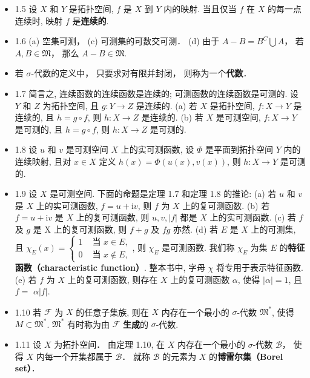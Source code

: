 \begin{itemize}
\item 1.5 设 $X$ 和 $Y$ 是拓扑空间, $f$ 是 $X$ 到 $Y$ 内的映射. 当且仅当 $f$ 在 $X$ 的每一点连续时, 映射 $f$ 是\textbf{连续的}.

\item 1.6 (a) 空集可测， (c) 可测集的可数交可测． (d) 由于 $A-B = B^C\bigcup A$， 若 $A,B \in \mathfrak{M}$， 那么 $A-B\in \mathfrak{M}$.

\item 若 $\sigma$-代数的定义中， 只要求对有限并封闭， 则称为一个\textbf{代数}．

\item 1.7 简言之, 连续函数的连续函数是连续的; 可测函数的连续函数是可测的. 设 $Y$ 和 $Z$ 为拓扑空间, 且 $g: Y \rightarrow Z$ 是连续的. (a) 若 $X$ 是拓扑空间, $f: X \rightarrow Y$ 是连续的, 且 $h=g \circ f$, 则 $h: X \rightarrow Z$ 是连续的. (b) 若 $X$ 是可测空间, $f: X \rightarrow Y$ 是可测的, 且 $h=g \circ f$, 则 $h: X \rightarrow Z$ 是可测的. 

\item 1.8 设 $u$ 和 $v$ 是可测空间 $X$ 上的实可测函数, 设 $\Phi$ 是平面到拓扑空间 $Y$ 内的连续映射, 且对 $x \in X$ 定义 $h(x)=\Phi(u(x), v(x))$, 则 $h: X \rightarrow Y$ 是可测的.

\item 1.9 设 $X$ 是可测空间. 下面的命题是定理 1.7 和定理 1.8 的推论:
(a) 若 $u$ 和 $v$ 是 $X$ 上的实可测函数, $f=u+\mathrm{i} v$, 则 $f$ 为 $X$ 上的复可测函数. 
(b) 若 $f=u+\mathrm{i} v$ 是 $X$ 上的复可测函数, 则 $u, v,|f|$ 都是 $X$ 上的实可测函数. 
(c) 若 $f$ 及 $g$ 是 $\mathrm{X}$ 上的复可测函数, 则 $f+g$ 及 $f g$ 亦然.
(d) 若 $E$ 是 $X$ 上的可测集, 且 $\chi_{E}(x)= \begin{cases}1 & \text { 当 } x \in E, \\ 0 & \text { 当 } x \notin E,\end{cases}$, 则 $\chi_{E}$ 是可测函数. 我们称 $\chi_{E}$ 为集 $E$ 的\textbf{特征函数（characteristic function）}. 整本书中, 字母 $\chi$ 将专用于表示特征函数.
(e) 若 $f$ 为 $X$ 上的复可测函数, 则存在 $X$ 上的复可测函数 $\alpha$, 使得 $|\alpha|=1$, 且 $f=$ $\alpha|f|$.

\item 1.10 若 $\mathscr{F}$ 为 $X$ 的任意子集族, 则在 $X$ 内存在一个最小的 $\sigma$-代数 $\mathfrak{M}^{*}$, 使得 $M \subset \mathfrak{M}^{*}$. $\mathfrak{M}^{*}$ 有时称为由 $\mathscr{F}$ \textbf{生成}的 $\sigma$-代数.

\item 1.11 设 $X$ 为拓扑空间． 由定理 1.10, 在 $X$ 内存在一个最小的 $\sigma$-代数 $\mathscr B$， 使得 $X$ 内每一个开集都属于 $\mathscr B$． 就称 $\mathscr B$ 的元素为 $X$ 的\textbf{博雷尔集（Borel set）}．


\end{itemize}
